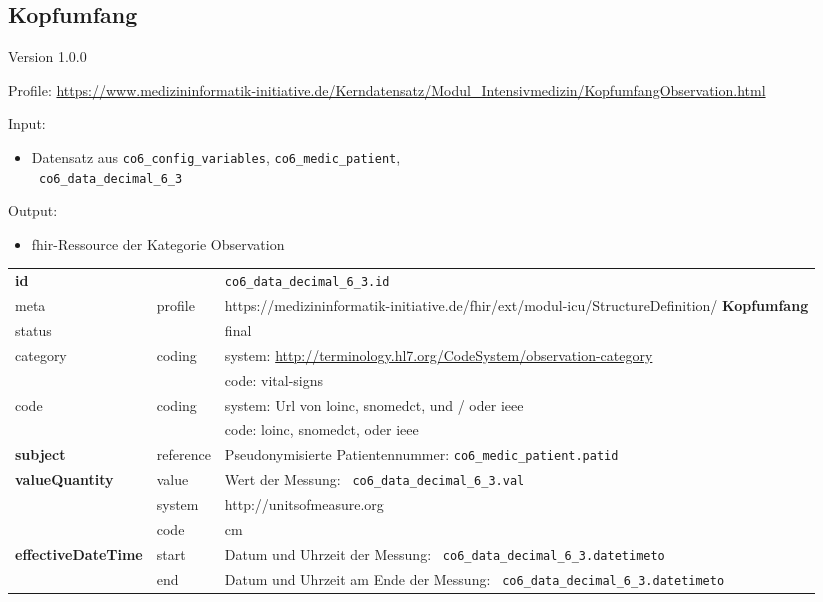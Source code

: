 \subsection{Kopfumfang} 
\noindent Version 1.0.0

\noindent Profile: \url{https://www.medizininformatik-initiative.de/Kerndatensatz/Modul_Intensivmedizin/KopfumfangObservation.html}

\noindent Input:
\begin{itemize}
	\item Datensatz aus \texttt{co6\_config\_variables}, \texttt{co6\_medic\_patient}, \\ \texttt{
co6\_data\_decimal\_6\_3}
\end{itemize}
Output:
\begin{itemize}
        \item \ac{fhir}-Ressource der Kategorie \glqq Observation\grqq{}
\end{itemize}
\begin{longtable}{|l|l|p{7.5cm}|}
        \hline
        \rowcolor{lightgray} \multicolumn{3}{|l|}{Data Mapping (inhaltlich)} \\ \hline
        \textbf{id} &  & \texttt{co6\_data\_decimal\_6\_3.id} \\ \hline
	meta & profile & https://medizininformatik-initiative.de/fhir/ext/modul-icu/StructureDefinition/\textbf{
Kopfumfang} \\ \hline 
	status &  & final   \\ \hline 
	category & coding & system: \url{http://terminology.hl7.org/CodeSystem/observation-category} \\
\cline{3-3}
	& & code: vital-signs \\ \hline
	code & coding & system: Url von \ac{loinc}, \ac{snomedct}, und / oder \ac{ieee} \\ 
	\cline{3-3} 
	 &  & code: \ac{loinc}, \ac{snomedct}, oder \ac{ieee} \\ \hline
	 \textbf{subject}  & reference & Pseudonymisierte Patientennummer: \texttt{co6\_medic\_patient.patid} \\ \hline
	 \textbf{valueQuantity}  & value & Wert der Messung: \texttt{
co6\_data\_decimal\_6\_3.val} \\
        \cline{2-3}
         & system & http://unitsofmeasure.org \\
         \cline{2-3}
         & code & cm \\ \hline
     \textbf{effectiveDateTime}  & start & Datum und Uhrzeit der Messung: \texttt{
co6\_data\_decimal\_6\_3.datetimeto} \\
    \cline{2-3}
     & end & Datum und Uhrzeit am Ende der Messung: \texttt{
co6\_data\_decimal\_6\_3.datetimeto} \\ \hline
\end{longtable}


